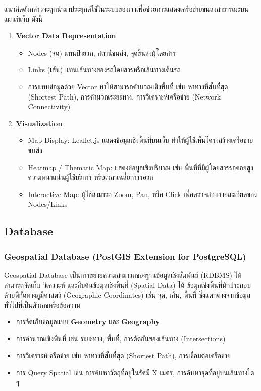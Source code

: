 \indent แนวคิดดังกล่าวจะถูกนํามาประยุกต์ใช้ในระบบของเราเพื่อช่วยการแสดงเครือข่ายขนส่งสาธารณะบนแผนที่เว็บ ดังนี้ 
\begin{enumerate}
    \item \textbf{Vector Data Representation}
    \begin{itemize}
        \item Nodes (จุด) แทนป้ายรถ, สถานีขนส่ง, จุดขึ้นลงผู้โดยสาร
        \item Links (เส้น) แทนเส้นทางของรถโดยสารหรือเส้นทางเดินรถ
        \item การแทนข้อมูลด้วย Vector ทำให้สามารถคำนวณเชิงพื้นที่ เช่น หาทางที่สั้นที่สุด (Shortest Path), การคำนวณระยะทาง, การวิเคราะห์เครือข่าย (Network Connectivity)
    \end{itemize}

    \item \textbf{Visualization}
    \begin{itemize}
        \item Map Display: Leaflet.js แสดงข้อมูลเชิงพื้นที่บนเว็บ ทำให้ผู้ใช้เห็นโครงสร้างเครือข่ายขนส่ง
        \item Heatmap / Thematic Map: แสดงข้อมูลเชิงปริมาณ เช่น พื้นที่ที่มีผู้โดยสารรอคอยสูง ความหนาแน่นผู้ใช้บริการ หรือเวลาเฉลี่ยการรอรถ
        \item Interactive Map: ผู้ใช้สามารถ Zoom, Pan, หรือ Click เพื่อตรวจสอบรายละเอียดของ Nodes/Links
    \end{itemize}
\end{enumerate}

\subsection{Database}
\subsubsection{Geospatial Database (PostGIS Extension for PostgreSQL)}
\indent Geospatial Database เป็นการขยายความสามารถของฐานข้อมูลเชิงสัมพันธ์ (RDBMS) 
ให้สามารถจัดเก็บ วิเคราะห์ และสืบค้นข้อมูลเชิงพื้นที่ (Spatial Data) ได้ 
ข้อมูลเชิงพื้นที่มักประกอบด้วยพิกัดทางภูมิศาสตร์ (Geographic Coordinates) 
เช่น จุด, เส้น, พื้นที่ ซึ่งแตกต่างจากข้อมูลทั่วไปที่เป็นตัวเลขหรือข้อความ
\begin{itemize}
    \item การจัดเก็บข้อมูลแบบ \textbf{Geometry} และ \textbf{Geography}
    \item การคำนวณเชิงพื้นที่ เช่น ระยะทาง, พื้นที่, การตัดกันของเส้นทาง (Intersections)
    \item การวิเคราะห์เครือข่าย เช่น หาทางที่สั้นที่สุด (Shortest Path), การเชื่อมต่อเครือข่าย
    \item การ Query Spatial เช่น การค้นหาวัตถุที่อยู่ในรัศมี X เมตร, การค้นหาจุดที่อยู่บนเส้นทางใด ๆ
\end{itemize}

